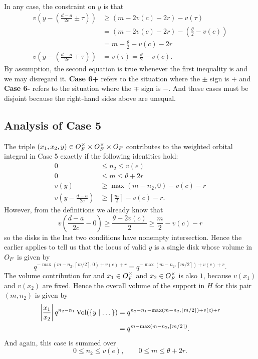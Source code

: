 \begin{description}
  In any case, the constraint on $y$ is that
  \begin{align*}
    v\left( y - \left( \frac{d-a}{2c} \pm \tau \right) \right)
      &\ge \left( m - 2v(c) - 2r \right) - v(\tau) \\
      &= \left( m - 2v(c) - 2r \right) - \left( \frac{\theta}{2} - v(c) \right) \\
      &= m - \frac{\theta}{2} - v(c) - 2r \\
    v\left( y - \left( \frac{d-a}{2c} \mp \tau \right) \right) &= v(\tau)
      = \frac{\theta}{2} - v(c).
  \end{align*}
  By assumption, the second equation is true
  whenever the first inequality is and we may disregard it.
  \textbf{Case 6\ts+} refers to the situation where the $\pm$ sign is $+$
  and \textbf{Case 6\ts-} refers to the situation where the $\mp$ sign is $-$.
  And these cases must be disjoint because the right-hand sides above are unequal.
\end{description}

\subsection{Analysis of Case 5}
The triple $(x_1, x_2, y) \in O_F^\times \times O_F^\times \times O_F$
contributes to the weighted orbital integral in Case 5 exactly if the following identities hold:
\begin{align*}
  0 &\le n_2 \le v(e) \\
  0 &\le m \le \theta + 2r \\
  v(y) &\ge \max(m-n_2,0) - v(c) - r \\
  v\left( y - \frac{d-a}{2c} \right) &\ge \left\lceil \frac{m}{2} \right\rceil - v(c) - r.
\end{align*}
However, from the definitions we already know that
\[ v\left( \frac{d-a}{2c} - 0 \right)
  \ge \frac{\theta - 2v(c)}{2} \ge \frac{m}{2} - v(c) - r \]
so the disks in the last two conditions have nonempty intersection.
Hence the earlier  applies to tell us that
the locus of valid $y$ is a single disk whose volume in $O_F$ is given by
\[ q^{-\max\left( m-n_2, \left\lceil m/2 \right\rceil, 0 \right) + v(c) + r}
  = q^{-\max\left( m-n_2, \left\lceil m/2 \right\rceil \right) + v(c) + r}. \]
The volume contribution for and $x_1 \in O_F^\times$ and $x_2 \in O_F^\times$
is also $1$, because $v(x_1)$ and $v(x_2)$ are fixed.
Hence the overall volume of the support in $H$ for this pair $(m, n_2)$ is given by
\begin{align*}
  \left\lvert \frac{x_1}{x_2} \right\rvert q^{n_2 - n_1} \operatorname{Vol}(\{ y \mid \dots \})
  &= q^{n_2 - n_1 -\max\left( m-n_2, \left\lceil m/2 \right\rceil \right) + v(c) + r} \\
  &= q^{m - \max\left( m-n_2, \left\lceil m/2 \right\rceil \right)}.
\end{align*}
And again, this case is summed over
\[ 0 \le n_2 \le v(e), \qquad 0 \le m \le \theta + 2r. \]

